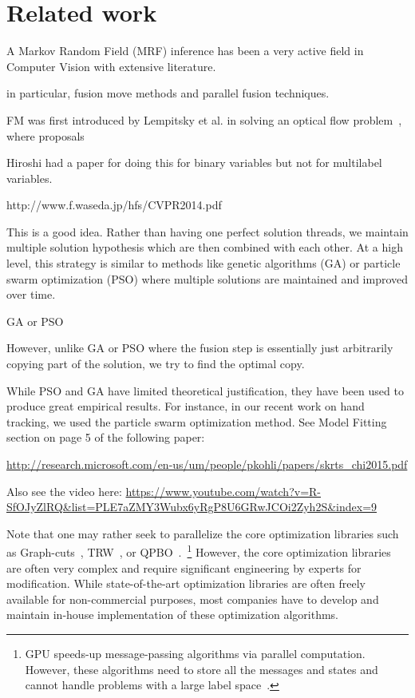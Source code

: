\section{Related work}


A Markov Random Field (MRF) inference has been a very active field in
Computer Vision with extensive literature.



in particular, fusion move methods and parallel fusion techniques.



FM was first introduced by Lempitsky et al. in solving an optical flow
problem~\cite{first_fusion_viktor}, where proposals

Hiroshi had a paper for doing this for binary variables but not for multilabel variables.

http://www.f.waseda.jp/hfs/CVPR2014.pdf

 This is a good idea.  Rather than having one perfect solution threads, we maintain multiple solution hypothesis which are then combined with each other.  At a high level, this strategy is similar to methods like genetic algorithms (GA) or particle swarm optimization (PSO) where multiple solutions are maintained and improved over time.

 

GA or PSO
 
However, unlike GA or PSO where the fusion step is essentially just arbitrarily copying part of the solution, we try to find the optimal copy.

 

While PSO and GA have limited theoretical justification, they have been
used to produce great empirical results. For instance, in our recent
work on hand tracking, we used the particle swarm optimization
method. See Model Fitting section on page 5 of the following paper:

\url{http://research.microsoft.com/en-us/um/people/pkohli/papers/skrts_chi2015.pdf}

Also see the video here: \url{https://www.youtube.com/watch?v=R-SfOJyZlRQ&list=PLE7aZMY3Wubx6yRgP8U6GRwJCOi2Zyh2S&index=9}

 



 
Note that one may rather seek to parallelize the core optimization
libraries such as Graph-cuts~\cite{}, TRW~\cite{kolmogorov}, or
QPBO~\cite{}.~\footnote{GPU speeds-up message-passing algorithms via
parallel computation. However, these algorithms need to store all the
messages and states and cannot handle problems with a large label space~\cite{layered_depthmap}.} However, the core optimization libraries are often
very complex and require significant engineering by experts for
modification.
%
While state-of-the-art optimization libraries are often freely available for
non-commercial purposes, most companies have to develop and maintain
in-house implementation of these optimization algorithms.
